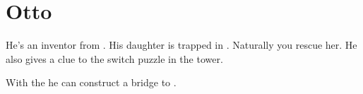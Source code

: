 \section{Otto}
\label{char:otto}


He’s an inventor from . His daughter  is trapped in . Naturally you rescue her. He also gives a clue to the switch puzzle in the tower.

\bigskip

With the  he can construct a bridge to .

